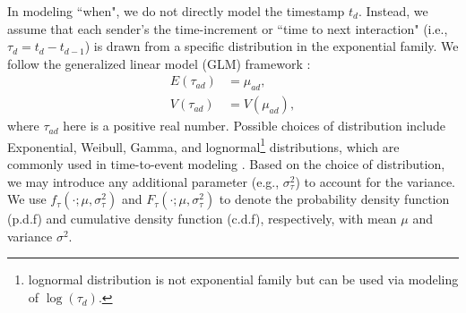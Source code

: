 \documentclass[12pt]{article}
\begin{document}
In modeling ``when", we do not directly model the timestamp $t_d$. Instead, we assume that each sender's the time-increment or ``time to next interaction" (i.e., $\tau_{d} = t_d-t_{d-1}$) is drawn from a specific distribution in the exponential family.  We follow the generalized linear model (GLM) framework \citep{nelder1972generalized}:
\begin{equation}
\begin{aligned}
E(\tau_{ad}) &= \mu_{ad},\\
V(\tau_{ad}) &= V(\mu_{ad}),
\end{aligned}
\end{equation}
where $\tau_{ad}$ here is a positive real number. Possible choices of distribution include Exponential, Weibull, Gamma, and lognormal\footnote{lognormal distribution is not exponential family but can be used via modeling of $\log(\tau_d)$.} distributions, which are commonly used in time-to-event modeling \citep{rao2000applied,rizopoulos2012joint}. Based on the choice of distribution, we may introduce any additional parameter (e.g., $\sigma_\tau^2$) to account for the variance. We use $f_\tau(\cdot; \mu, \sigma_\tau^2)$ and $F_\tau(\cdot; \mu, \sigma_\tau^2)$ to denote the probability density function (p.d.f) and cumulative density function (c.d.f), respectively, with mean $\mu$ and variance $\sigma^2$.
\end{document}
